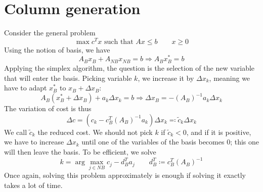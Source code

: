 \documentclass[11pt, openany]{report}
\theoremstyle{definition}
\begin{document}
\chapter{Column generation}
Consider the general problem
\begin{equation}
    \max c^Tx \text{ such that } Ax \le b \qquad x\ge 0
\end{equation}
Using the notion of basis, we have 
\begin{equation}
    A_Bx_B + A_{NB}x_{NB} = b\Longrightarrow A_Bx_B^* = b
\end{equation}
Applying the simplex algorithm, the question is the selection of the new variable that will enter the basis. Picking variable $k$, we increase it by $\Delta x_k$, meaning we have to adapt $x_B^*$ to $x_B+\Delta x_B$:
\begin{equation}
    A_B(x_B^*+\Delta x_B) + a_k \Delta x_k = b\Longrightarrow \Delta x_B = -(A_B)^{-1}a_k\Delta x_k
\end{equation}
The variation of cost is thus 
\begin{equation}
    \Delta c = (c_k - c_B^T (A_B)^{-1}a_k)\Delta x_k \eqcolon \tilde c_k \Delta x_k
\end{equation}
We call $\tilde c_k$ the reduced cost. We should not pick $k$ if $\tilde c_k<0$, and if it is positive, we have to increase $\Delta x_k$ until one of the variables of the basis becomes 0; this one will then leave the basis. To be efficient, we solve
\begin{equation}
    k = \arg\max_{j\in NB} c_j-d^T_B a_j\qquad d_B^T \coloneqq c_B^T(A_B)^{-1}
\end{equation}
Once again, solving this problem approximately is enough if solving it exactly takes a lot of time. 
\end{document}
